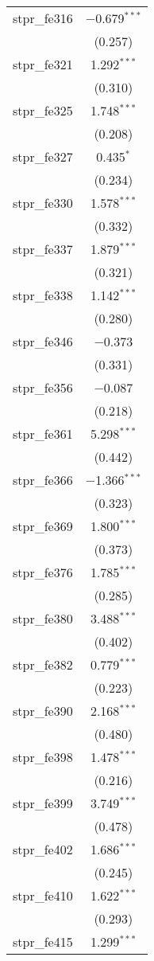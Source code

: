\begin{table}[!htbp]
\begin{tabular}{@{\extracolsep{5pt}}lc}
  stpr\_fe316 & $-$0.679$^{***}$ \\ 
  & (0.257) \\ 
  stpr\_fe321 & 1.292$^{***}$ \\ 
  & (0.310) \\ 
  stpr\_fe325 & 1.748$^{***}$ \\ 
  & (0.208) \\ 
  stpr\_fe327 & 0.435$^{*}$ \\ 
  & (0.234) \\ 
  stpr\_fe330 & 1.578$^{***}$ \\ 
  & (0.332) \\ 
  stpr\_fe337 & 1.879$^{***}$ \\ 
  & (0.321) \\ 
  stpr\_fe338 & 1.142$^{***}$ \\ 
  & (0.280) \\ 
  stpr\_fe346 & $-$0.373 \\ 
  & (0.331) \\ 
  stpr\_fe356 & $-$0.087 \\ 
  & (0.218) \\ 
  stpr\_fe361 & 5.298$^{***}$ \\ 
  & (0.442) \\ 
  stpr\_fe366 & $-$1.366$^{***}$ \\ 
  & (0.323) \\ 
  stpr\_fe369 & 1.800$^{***}$ \\ 
  & (0.373) \\ 
  stpr\_fe376 & 1.785$^{***}$ \\ 
  & (0.285) \\ 
  stpr\_fe380 & 3.488$^{***}$ \\ 
  & (0.402) \\ 
  stpr\_fe382 & 0.779$^{***}$ \\ 
  & (0.223) \\ 
  stpr\_fe390 & 2.168$^{***}$ \\ 
  & (0.480) \\ 
  stpr\_fe398 & 1.478$^{***}$ \\ 
  & (0.216) \\ 
  stpr\_fe399 & 3.749$^{***}$ \\ 
  & (0.478) \\ 
  stpr\_fe402 & 1.686$^{***}$ \\ 
  & (0.245) \\ 
  stpr\_fe410 & 1.622$^{***}$ \\ 
  & (0.293) \\ 
  stpr\_fe415 & 1.299$^{***}$ \\ 

\end{tabular}
\end{table}
